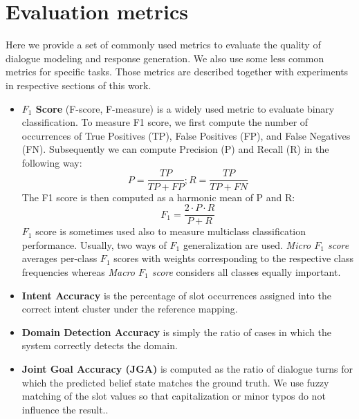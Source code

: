 \section{Evaluation metrics}
\label{02:sec:eval_metrics}
Here we provide a set of commonly used metrics to evaluate the quality of dialogue modeling and response generation.
We also use some less common metrics for specific tasks.
Those metrics are described together with experiments in respective sections of this work.
\begin{itemize}
    \item \textbf{$F_1$ Score} (F-score, F-measure) is a widely used metric to evaluate binary classification.
    To measure F1 score, we first compute the number of occurrences of True Positives (TP), False Positives (FP), and False Negatives (FN).
    Subsequently we can compute Precision (P) and Recall (R) in the following way:
    \begin{equation*}
        P = \frac{TP}{TP + FP}; R = \frac{TP}{TP + FN}
    \end{equation*}
    The F1 score is then computed as a harmonic mean of P and R:
    \begin{equation*}
        F_1 = \frac{2\cdot P \cdot R}{P + R}
    \end{equation*}
    $F_1$ score is sometimes used also to measure multiclass classification performance.
    Usually, two ways of $F_1$ generalization are used. \emph{Micro $F_1$ score} averages per-class $F_1$ scores with weights corresponding to the respective class frequencies whereas \emph{Macro $F_1$ score} considers all classes equally important.
    \item \textbf{Intent Accuracy} is the percentage of slot occurrences assigned into the correct intent cluster under the reference mapping.
    \item \textbf{Domain Detection Accuracy} is simply the ratio of cases in which the system correctly detects the domain.
    \item \textbf{Joint Goal Accuracy (JGA)} is computed as the ratio of dialogue turns for which the predicted belief state matches the ground truth.
    We use fuzzy matching of the slot values so that capitalization or minor typos do not influence the result.\cite{mrkvsic2016neural}.
    

\end{itemize}
